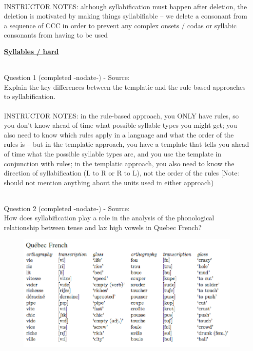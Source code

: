 \documentclass[12pt]{article}
\begin{document}
~\\
INSTRUCTOR NOTES: although syllabification must happen after deletion, the deletion is motivated by making things syllabifiable -- we delete a consonant from a sequence of CCC in order to prevent any complex onsets / codas or syllabic consonants from having to be used


\newpage\textbf{\underline{\huge Syllables / hard\\}}

~\\

{\large Question 1} (completed -nodate-) - Source: \\

Explain the key differences between the templatic and the rule-based approaches to syllabification.\\


~\\
INSTRUCTOR NOTES: in the rule-based approach, you ONLY have rules, so you don't know ahead of time what possible syllable types you might get; you also need to know which rules apply in a language and what the order of the rules is -- but in the templatic approach, you have a template that tells you ahead of time what the possible syllable types are, and you use the template in conjunction with rules; in the templatic approach, you also need to know the direction of syllabification (L to R or R to L), not the order of the rules [Note: should not mention anything about the units used in either approach)


~\\

{\large Question 2} (completed -nodate-) - Source: \\

How does syllabification play a role in the analysis of the phonological relationship between tense and lax high vowels in Quebec French?\\

\begin{figure}[H]
\includegraphics{../images/quebecfrench.png}
\end{figure}
\end{document}
